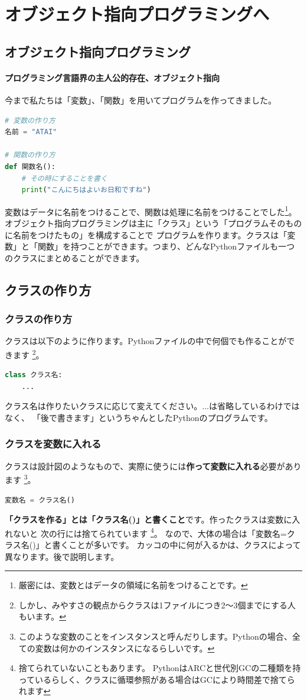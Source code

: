\documentclass[12pt, a4paper, dvipdfmx]{book}
\begin{document}
\chapter{オブジェクト指向プログラミングへ}
\section{オブジェクト指向プログラミング}
\subsubsection{プログラミング言語界の主人公的存在、オブジェクト指向}
今まで私たちは「変数」、「関数」を用いてプログラムを作ってきました。
\begin{lstlisting}[caption=復習,label=sample, language=Python]
# 変数の作り方
名前 = "ATAI"

# 関数の作り方
def 関数名():
    # その時にすることを書く
    print("こんにちはよいお日和ですね")
\end{lstlisting}
変数はデータに名前をつけることで、関数は処理に名前をつけることでした\footnote{厳密には、変数とはデータの領域に名前をつけることです。}。
オブジェクト指向プログラミングは主に「クラス」という「プログラムそのものに名前をつけたもの」を構成することで
プログラムを作ります。クラスは「変数」と「関数」を持つことができます。つまり、どんなPythonファイルも一つのクラスにまとめることができます。
\section{クラスの作り方}
\subsection{クラスの作り方}
クラスは以下のように作ります。Pythonファイルの中で何個でも作ることができます
\footnote{しかし、みやすさの観点からクラスは1ファイルにつき2〜3個までにする人もいます。}。
\newpage
\begin{lstlisting}[caption=クラスの作り方,label=sample, language=Python]
class クラス名:
    ...
\end{lstlisting}
クラス名は作りたいクラスに応じて変えてください。...は省略しているわけではなく、
「後で書きます」というちゃんとしたPythonのプログラムです。

\subsection{クラスを変数に入れる}
クラスは設計図のようなもので、実際に使うには\textbf{作って変数に入れる}必要があります
\footnote{このような変数のことをインスタンスと呼んだりします。Pythonの場合、全ての変数は何かのインスタンスになるらしいです。}。
\begin{lstlisting}[caption=クラスを変数に入れる,label=sample, language=Python]
変数名 = クラス名()
\end{lstlisting}
\textbf{「クラスを作る」とは「クラス名()」と書くこと}です。作ったクラスは変数に入れないと
次の行には捨てられています
\footnote{捨てられていないこともあります。
  PythonはARCと世代別GCの二種類を持っているらしく、クラスに循環参照がある場合はGCにより時間差で捨てられます}。
なので、大体の場合は「変数名=クラス名()」と書くことが多いです。
カッコの中に何が入るかは、クラスによって異なります。後で説明します。
\end{document}
